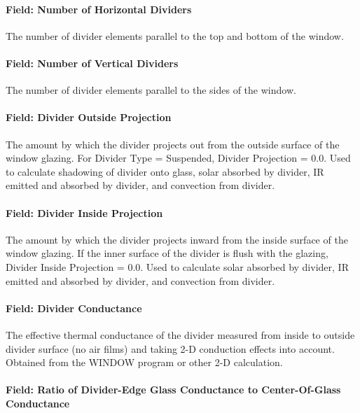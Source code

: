 \paragraph{Field: Number of Horizontal Dividers}\label{field-number-of-horizontal-dividers}

The number of divider elements parallel to the top and bottom of the window.

\paragraph{Field: Number of Vertical Dividers}\label{field-number-of-vertical-dividers}

The number of divider elements parallel to the sides of the window.

\paragraph{Field: Divider Outside Projection}\label{field-divider-outside-projection}

The amount by which the divider projects out from the outside surface of the window glazing. For Divider Type = Suspended, Divider Projection = 0.0. Used to calculate shadowing of divider onto glass, solar absorbed by divider, IR emitted and absorbed by divider, and convection from divider.

\paragraph{Field: Divider Inside Projection}\label{field-divider-inside-projection}

The amount by which the divider projects inward from the inside surface of the window glazing. If the inner surface of the divider is flush with the glazing, Divider Inside Projection = 0.0. Used to calculate solar absorbed by divider, IR emitted and absorbed by divider, and convection from divider.

\paragraph{Field: Divider Conductance}\label{field-divider-conductance}

The effective thermal conductance of the divider measured from inside to outside divider surface (no air films) and taking 2-D conduction effects into account. Obtained from the WINDOW program or other 2-D calculation.

\paragraph{Field: Ratio of Divider-Edge Glass Conductance to Center-Of-Glass Conductance}\label{field-ratio-of-divider-edge-glass-conductance-to-center-of-glass-conductance}

